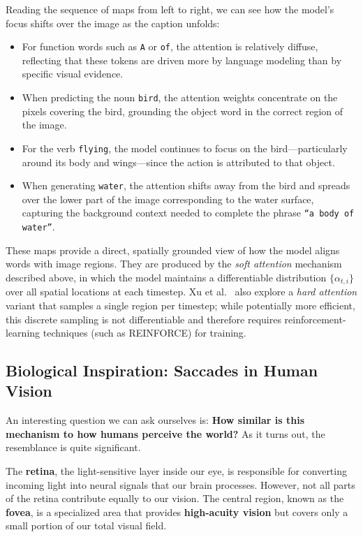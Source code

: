 Reading the sequence of maps from left to right, we can see how the model’s focus shifts over the image as the caption unfolds:
\begin{itemize}
	\item For function words such as \texttt{A} or \texttt{of}, the attention is relatively diffuse, reflecting that these tokens are driven more by language modeling than by specific visual evidence.
	\item When predicting the noun \texttt{bird}, the attention weights concentrate on the pixels covering the bird, grounding the object word in the correct region of the image.
	\item For the verb \texttt{flying}, the model continues to focus on the bird---particularly around its body and wings---since the action is attributed to that object.
	\item When generating \texttt{water}, the attention shifts away from the bird and spreads over the lower part of the image corresponding to the water surface, capturing the background context needed to complete the phrase \texttt{``a body of water''}.
\end{itemize}

These maps provide a direct, spatially grounded view of how the model aligns words with image regions.
They are produced by the \emph{soft attention} mechanism described above, in which the model maintains a differentiable distribution \(\{\alpha_{t,i}\}\) over all spatial locations at each timestep.
Xu et al.~\cite{xu2015_showattend} also explore a \emph{hard attention} variant that samples a single region per timestep; while potentially more efficient, this discrete sampling is not differentiable and therefore requires reinforcement-learning techniques (such as REINFORCE) for training.

\newpage

\subsection{Biological Inspiration: Saccades in Human Vision}

\noindent An interesting question we can ask ourselves is: \textbf{How similar is this mechanism to how humans perceive the world?} As it turns out, the resemblance is quite significant.

\noindent The \textbf{retina}, the light-sensitive layer inside our eye, is responsible for converting incoming light into neural signals that our brain processes. However, not all parts of the retina contribute equally to our vision. The central region, known as the \textbf{fovea}, is a specialized area that provides \textbf{high-acuity vision} but covers only a small portion of our total visual field.

